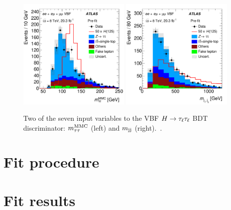 \begin{figure}[tp]
  \centering
  \includegraphics[width=0.48\textwidth]{figures/HIGG-2013-32/figaux_03c}
  \includegraphics[width=0.48\textwidth]{figures/HIGG-2013-32/figaux_03b}
  \caption{Two of the seven input variables to the VBF $H\rightarrow\tau_\ell\tau_\ell$ BDT discriminator: $m_{\tau\tau}^\text{MMC}$ (left) and $m_{\text{jj}}$ (right).~\cite{HIGG-2013-32}.}
  \label{fig:results-inputs-hadhad}
\end{figure}

\section{Fit procedure}
\label{sec:results-fit-procedure}

\section{Fit results}
\label{sec:results-fit-results}

\clearpage

